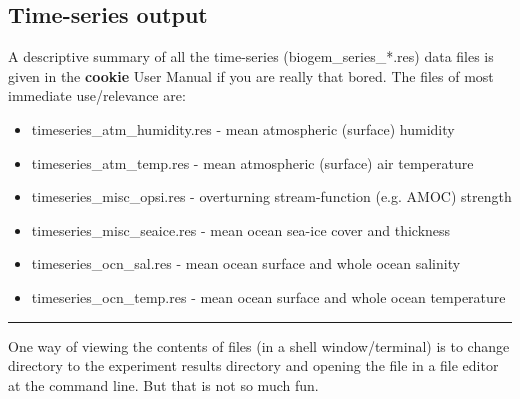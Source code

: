 
\subsection{Time-series output}

A descriptive summary of all the time-series (\textsf{\footnotesize biogem\_series\_*.res}) data files is given in the \textbf{cookie} User Manual if you are really that bored. The files of most immediate use/relevance are:

\vspace{1mm}
\begin{itemize}[noitemsep]
\setlength{\itemindent}{.2in}
\item \textsf{\footnotesize timeseries\_atm\_humidity.res}  - mean atmospheric (surface) humidity
\item \textsf{\footnotesize timeseries\_atm\_temp.res}      - mean atmospheric (surface) air temperature
\item \textsf{\footnotesize timeseries\_misc\_opsi.res}     - overturning stream-function (e.g. AMOC) strength
\item \textsf{\footnotesize timeseries\_misc\_seaice.res}   - mean ocean sea-ice cover and thickness
\item \textsf{\footnotesize timeseries\_ocn\_sal.res}       - mean ocean surface and whole ocean salinity
\item \textsf{\footnotesize timeseries\_ocn\_temp.res}      - mean ocean surface and whole ocean temperature
\end{itemize}

\vspace{1mm}\noindent\rule{4cm}{0.1mm}\vspace{2mm}

\noindent One way of viewing the contents of files (in a shell window/terminal) is to change directory to the experiment results directory and opening the file in a file editor at the command line. But that is not so much fun.

